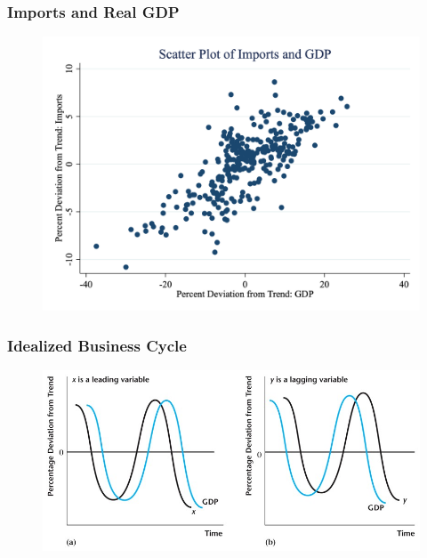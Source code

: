 \documentclass{beamer}
\begin{document}
\begin{frame}
\frametitle[alignment=center]{Imports and Real GDP}
\begin{figure}
\centering
\includegraphics[scale=0.25]{Figures/Fig_3pt6.png}
\end{figure}
\end{frame}

\begin{frame}
\frametitle[alignment=center]{Idealized Business Cycle}
\begin{figure}
\centering
\includegraphics[scale=0.25]{Figures/W_Fig_3pt7.png}
\end{figure}
\end{frame}
\end{document}
